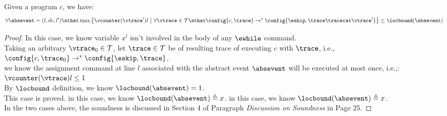 \begin{lem}
  \label{lem:local_bound_sound}
Given a program ${c}$, we have:
%
\[
\forall \absevent = (l, dc, l') \sthat  
\max \left\{ \vcounter(\vtrace') l ~ \middle\vert~
\forall \vtrace \in \mathcal{T} \sthat  \config{{c}, \trace} \to^{*} \config{\eskip, \trace\tracecat\vtrace'} \right\} 
\leq 
\locbound(\absevent)
\]
\end{lem}
\begin{proof}
  In this case, we know variable $x^l$ isn't involved in the body of any $\ewhile$ command. 
  \\
  Taking an arbitrary $\vtrace_0 \in \mathcal{T}$, 
  let $\trace \in \mathcal{T}$ be of resulting trace of executing $c$ with $\trace$, 
  i.e., $\config{{c}, \trace_0} \to^{*} \config{\eskip, \trace}$,
  \\
  we know the
  assignment command at line $l$ associated with the abstract event $\absevent$ will be executed at most once, i.e.,:
  $\vcounter(\vtrace) l \leq 1$
  \\
  By $\locbound$ definition, we know $\locbound(\absevent) = 1$.
  \\
  This case is proved.
    in this case, we know $\locbound(\absevent) \triangleq x$.
    in this case, we know $\locbound(\absevent) \triangleq x$.
  \\
  In the two cases above, the soundness is discussed in \cite{sinn2017complexity} Section 4 of Paragraph \emph{Discussion on Soundness} in Page 25.
\end{proof}
